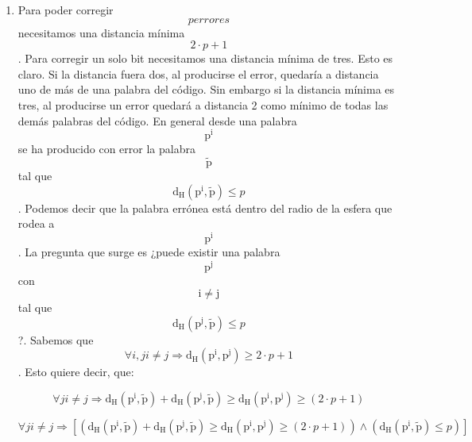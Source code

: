 \documentclass[
]{article}
\begin{document}
\begin{enumerate}
\begin{enumerate}
\begin{enumerate}
\begin{enumerate}
        palabra con el bit equivocado quede de forma tal que sea claro
        desde cual palabra del código correcto se ha producido el error.
        No podremos tener dos palabras distintas del código a distancia
        mínima de la pa\-labra equivocada, sino solamente una. La
        corrección consistiría en cambiar la pa\-labra equivocada por la
        única más cercana del código. El principio de corrección es el
        máxima verosimilitud (esperanza matemática).
      \item
        Para poder corregir\[p\mathit{errores}\]necesitamos una
        distancia mínima\[{2 \cdot p} + 1\]. Para corregir un solo bit
        necesitamos una distancia mínima de tres. Esto es claro. Si la
        distancia fuera dos, al producirse el error, quedaría a
        distancia uno de más de una palabra del código. Sin embargo si
        la distancia mínima es tres, al producirse un error quedará a
        distancia 2 como mínimo de todas las demás palabras del
        códi\-go. En general desde una palabra
        \[\mathtt{\mathrm{p^{i}}}\] se ha producido con error la palabra
        \[\mathtt{\mathrm{\widetilde{p}}}\]tal que
        \[\mathtt{\mathrm{d_{H}}}{\left( {\mathtt{\mathrm{p^{i}}},\mathtt{\mathrm{\widetilde{p}}}} \right) \leq p}\].
        Podemos decir que la palabra errónea está dentro del radio de la
        esfera que rodea a \[\mathtt{\mathrm{p^{i}}}\]. La pregunta que
        surge es ¿puede existir una palabra
        \[\mathtt{\mathrm{p^{j}}}\]con \[\mathtt{\mathrm{i \neq j}}\]tal
        que
        \[\mathtt{\mathrm{d_{H}}}{\left( {\mathtt{\mathrm{p^{j}}},\mathtt{\mathrm{\widetilde{p}}}} \right) \leq p}\]?.
        Sabemos que
        \[\forall i,j{i \neq j}\Rightarrow\mathtt{\mathrm{d_{H}}}{\left( {\mathtt{\mathrm{p^{i}}},\mathtt{\mathrm{p^{j}}}} \right) \geq {{2 \cdot p} + 1}}\].
        Esto quiere decir, que:

        \[\forall j{i \neq j}\Rightarrow\mathtt{\mathrm{d_{H}}}{\left( {\mathtt{\mathrm{p^{i}}},\mathtt{\mathrm{\widetilde{p}}}} \right) + \mathtt{\mathrm{d_{H}}}}{\left( {\mathtt{\mathrm{p^{j}}},\mathtt{\mathrm{\widetilde{p}}}} \right) \geq \mathtt{\mathrm{d_{H}}}}{\left( {\mathtt{\mathrm{p^{i}}},\mathtt{\mathrm{p^{j}}}} \right) \geq \left( {{2 \cdot p} + 1} \right)}\]

        \[\forall j{i \neq j}\Rightarrow\left\lbrack {\left( {\mathtt{\mathrm{d_{H}}}{\left( {\mathtt{\mathrm{p^{i}}},\mathtt{\mathrm{\widetilde{p}}}} \right) + \mathtt{\mathrm{d_{H}}}}{\left( {\mathtt{\mathrm{p^{j}}},\mathtt{\mathrm{\widetilde{p}}}} \right) \geq \mathtt{\mathrm{d_{H}}}}{\left( {\mathtt{\mathrm{p^{i}}},\mathtt{\mathrm{p^{j}}}} \right) \geq \left( {{2 \cdot p} + 1} \right)}} \right) \land \left( {\mathtt{\mathrm{d_{H}}}{\left( {\mathtt{\mathrm{p^{i}}},\mathtt{\mathrm{\widetilde{p}}}} \right) \leq p}} \right)} \right\rbrack\]


\end{enumerate}
\end{enumerate}
\end{enumerate}
\end{enumerate}
\end{document}
